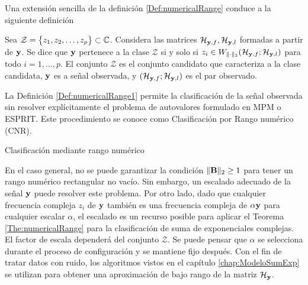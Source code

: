 			Una extensión sencilla de la definición \eqref{Def:numericalRange} conduce a la siguiente definición
			
			\begin{definition}\label{Def:numericalRange1}
				Sea $\mathcal{Z}= \big\{z_1,z_2,\ldots,z_p\big\}\subset\mathbb{C}$. Considera las matrices $\mathcal{H}_{\mathbf{y},f},\mathcal{H}_{\mathbf{y},l}$ formadas a partir de $\mathbf{y}$. Se dice que $\mathbf{y}$ pertenece a la clase $\mathcal{Z}$ si y solo si $z_i\in W_{\|\cdot\|_2}(\mathcal{H}_{\mathbf{y},f};\mathcal{H}_{\mathbf{y},l})$ para todo $i=1,\ldots,p$.
				El conjunto $\mathcal{Z}$ es el conjunto candidato que caracteriza a la clase candidata, $\mathbf{y}$ es a señal observada, y $(\mathcal{H}_{\mathbf{y},f};\mathcal{H}_{\mathbf{y},l})$ es el par observado.
			\end{definition}
			
			La Definición \eqref{Def:numericalRange1} permite la clasificación de la señal observada sin resolver explícitamente el problema de autovalores formulado en MPM o ESPRIT. Este procedimiento se conoce como Clasificación por Rango numérico (CNR).
			
			\begin{algorithm}
				\caption{Clasificación mediante rango numérico}
				\begin{algorithmic}[1]
					\label{step:lro_Hankel}
						\label{step:scaleA}
						\label{step:scaleB}
					\EndIf
						 \label{step:inclusion_normF}
							\Return
						\Else
								\Return
							\EndIf
						\EndIf
					\EndFor
				\end{algorithmic}
				\label{Algorithm_CNR}
			\end{algorithm}		
			
			En el caso general, no se puede garantizar la condición $\|\mathbf{B}\|_2\ge 1$ para tener un rango numérico rectangular no vacío. Sin embargo, un escalado adecuado de la señal $\mathbf{y}$ puede resolver este problema. Por otro lado, dado que cualquier frecuencia compleja $z_i$ de $\mathbf{y}$ también es una frecuencia compleja de $\alpha\mathbf{y}$ para cualquier escalar $\alpha$, el escalado es un recurso posible para aplicar el Teorema \eqref{The:numericalRange} para la clasificación de suma de exponenciales complejas. El factor de escala dependerá del conjunto $\mathcal{Z}$. Se puede pensar que $\alpha$ se selecciona durante el proceso de configuración y se mantiene fijo después. Con el fin de tratar datos con ruido, los algoritmos vistos en el capítulo \eqref{chap:ModeloSumExp} se utilizan para obtener una aproximación de bajo rango de la matriz $\mathcal{H}_{\mathbf{y}}$.
			
